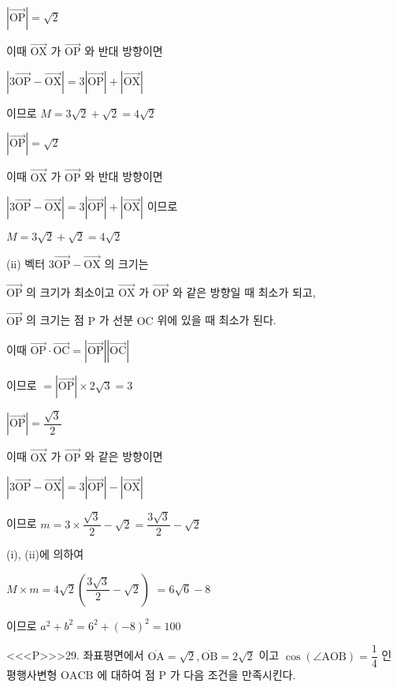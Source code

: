 \documentclass{oblivoir}
\begin{document}
$|\overrightarrow{\mathrm{OP}}|=\sqrt{2}$

이때 $\overrightarrow{\mathrm{OX}}$ 가 $\overrightarrow{\mathrm{OP}}$ 와 반대 방향이면

$|3 \overrightarrow{\mathrm{OP}}-\overrightarrow{\mathrm{OX}}|=3|\overrightarrow{\mathrm{OP}}|+|\overrightarrow{\mathrm{OX}}|$

이므로 $M=3 \sqrt{2}+\sqrt{2}=4 \sqrt{2}$

$|\overrightarrow{\mathrm{OP}}|=\sqrt{2}$

이때 $\overrightarrow{\mathrm{OX}}$ 가 $\overrightarrow{\mathrm{OP}}$ 와 반대 방향이면

$|3 \overrightarrow{\mathrm{OP}}-\overrightarrow{\mathrm{OX}}|=3|\overrightarrow{\mathrm{OP}}|+|\overrightarrow{\mathrm{OX}}|$
이므로

$M=3 \sqrt{2}+\sqrt{2}=4 \sqrt{2}$

(ii) 벡터 $3 \overrightarrow{\mathrm{OP}}-\overrightarrow{\mathrm{OX}}$ 의 크기는

$\overrightarrow{\mathrm{OP}}$ 의 크기가 최소이고 $\overrightarrow{\mathrm{OX}}$ 가 $\overrightarrow{\mathrm{OP}}$ 와 같은 방향일 때 최소가 되고,

$\overrightarrow{\mathrm{OP}}$ 의 크기는 점 $\mathrm{P}$ 가 선분 $\mathrm{OC}$ 위에 있을 때 최소가 된다.

이때
$\overrightarrow{\mathrm{OP}} \cdot \overrightarrow{\mathrm{OC}}=|\overrightarrow{\mathrm{OP}}||\overrightarrow{\mathrm{OC}}|$

이므로 $=|\overrightarrow{\mathrm{OP}}| \times 2 \sqrt{3}=3$

$|\overrightarrow{\mathrm{OP}}|=\dfrac{\sqrt{3}}{2}$

이때 $\overrightarrow{\mathrm{OX}}$ 가 $\overrightarrow{\mathrm{OP}}$ 와 같은 방향이면

$|3 \overrightarrow{\mathrm{OP}}-\overrightarrow{\mathrm{OX}}|=3|\overrightarrow{\mathrm{OP}}|-|\overrightarrow{\mathrm{OX}}|$

이므로 $m=3 \times \dfrac{\sqrt{3}}{2}-\sqrt{2}=\dfrac{3 \sqrt{3}}{2}-\sqrt{2}$

(i), (ii)에 의하여

$M \times m =4 \sqrt{2}\left(\dfrac{3 \sqrt{3}}{2}-\sqrt{2}\right)$
$=6 \sqrt{6}-8$

이므로 $a^{2}+b^{2} =6^{2}+(-8)^{2} =100$



<<<P>>>29. 좌표평면에서 $\overline{\mathrm{OA}}=\sqrt{2}, \overline{\mathrm{OB}}=2 \sqrt{2}$ 이고 $\cos (\angle \mathrm{AOB})=\dfrac{1}{4}$ 인 평행사변형 $\mathrm{OACB}$ 에 대하여 점 $\mathrm{P}$ 가 다음 조건을 만족시킨다.
\end{document}
